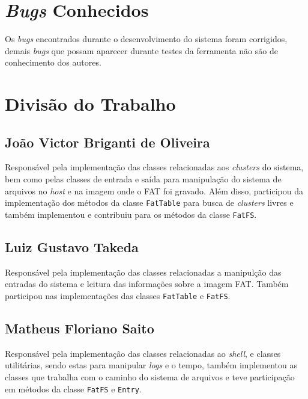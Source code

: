 \documentclass[
    12pt,				%
    oneside,   	        %
    a4paper,			%
    english,			%
    french,				%
    spanish,			%
    brazil,				%
    ]{pacotes/abntex2}
\begin{document}
\section{\textit{Bugs} Conhecidos}
\label{sec:bugs}

Os \textit{bugs} encontrados durante o desenvolvimento do sistema foram corrigidos, demais \textit{bugs} que possam aparecer durante testes da ferramenta não são de conhecimento dos autores.

\section{Divisão do Trabalho}
\label{sec:trabalhadores_univos}

\subsection{João Victor Briganti de Oliveira}
\label{subsec:joao}

Responsável pela implementação das classes relacionadas aos \textit{clusters} do sistema, bem como pelas classes de entrada e saída para manipulação do sistema de arquivos no \textit{host} e na imagem onde o FAT foi gravado. Além disso, participou da implementação dos métodos da classe \texttt{FatTable} para busca de \textit{clusters} livres e também implementou e contribuiu para os métodos da classe \texttt{FatFS}.

\subsection{Luiz Gustavo Takeda}
\label{subsec:luizinho}

Responsável pela implementação das classes relacionadas a manipulção das entradas do sistema e leitura das informações sobre a imagem FAT. Também participou nas implementações das classes \texttt{FatTable} e \texttt{FatFS}.  

\subsection{Matheus Floriano Saito}
\label{subsec:peixoto}
Responsável pela implementação das classes relacionadas ao \textit{shell}, e classes utilitárias, sendo estas para manipular \textit{logs} e o tempo, também implementou as classes que trabalha com o caminho do sistema de arquivos e teve participação em métodos da classe \texttt{FatFS} e \texttt{Entry}.


\end{document}
